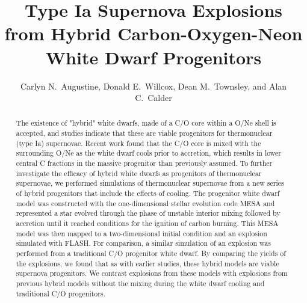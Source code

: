 \documentclass[iop,apj]{emulateapj}
\begin{document}
\title{Type Ia Supernova Explosions from Hybrid Carbon-Oxygen-Neon White Dwarf Progenitors}

\author{
Carlyn N.\ Augustine,
Donald E.\ Willcox,
Dean M.\ Townsley,
and Alan C.\ Calder
}


\begin{abstract}
The existence of "hybrid" white dwarfs, made of a C/O
core within a O/Ne shell is accepted, and studies indicate that these are 
viable progenitors for thermonuclear (type Ia) supernovae.
Recent work found that the C/O core is mixed with the surrounding O/Ne
as the white dwarf cools prior to accretion, which results in lower central 
C fractions in the massive progenitor than previously assumed. To further 
investigate the efficacy of hybrid white dwarfs as progenitors of 
thermonuclear supernovae, we performed simulations of thermonuclear 
supernovae from a new series of hybrid progenitors that include the 
effects of cooling. The progenitor white dwarf model
was constructed with the one-dimensional stellar evolution code MESA and
represented a star evolved through the phase of unstable interior mixing 
followed by accretion until it reached conditions for the ignition of 
carbon burning. This MESA model was then mapped to a two-dimensional initial 
condition and an explosion simulated with FLASH. For comparison, a similar
simulation of an explosion was performed from a traditional C/O progenitor
white dwarf. By comparing the yields of the explosions, we found that as
with earlier studies, these hybrid models are viable supernova progenitors.
We contrast explosions from these models with explosions 
from previous hybrid models 
{\color{red} without the mixing during the white dwarf cooling}
and traditional C/O progenitors.
\end{abstract}

\end{document}
